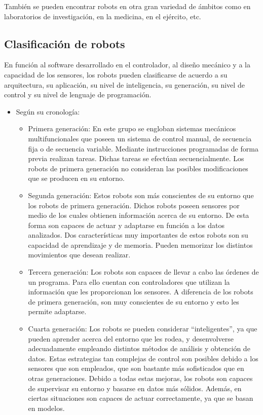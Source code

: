 También se pueden encontrar robots en otra gran variedad de ámbitos como en laboratorios de investigación, en la medicina, en el ejército, etc. 

\subsection{Clasificación de robots} 
En función al software desarrollado en el controlador, al diseño mecánico y a la capacidad de los sensores, los robots pueden clasificarse de acuerdo a su arquitectura, su aplicación, su nivel de inteligencia, su generación, su nivel de control y su nivel de lenguaje de programación.

\begin{itemize}
    \item Según su cronología:
    \begin{itemize}
         \item Primera generación: En este grupo se engloban sistemas mecánicos multifuncionales que poseen un sistema de control manual, de secuencia fija o de secuencia variable. Mediante instrucciones programadas de forma previa realizan tareas. Dichas tareas se efectúan secuencialmente. Los robots de primera generación no consideran las posibles modificaciones que se producen en su entorno. 
         \item Segunda generación: Estos robots son más conscientes de su entorno que los robots de primera generación. Dichos robots poseen sensores por medio de los cuales obtienen información acerca de su entorno. De esta forma son capaces de actuar y adaptarse en función a los datos analizados. Dos características muy importantes de estos robots son su capacidad de aprendizaje y de memoria. Pueden memorizar los distintos movimientos que desean realizar.
         \item Tercera generación: Los robots son capaces de llevar a cabo las órdenes de un programa. Para ello cuentan con controladores que utilizan la información que les proporcionan los sensores. A diferencia de los robots de primera generación, son muy conscientes de su entorno y esto les permite adaptarse.
         \item Cuarta generación: Los robots se pueden considerar “inteligentes”, ya que pueden aprender acerca del entorno que les rodea, y desenvolverse adecuadamente empleando distintos métodos de análisis y obtención de datos. Estas estrategias tan complejas de control son posibles debido a los sensores que son empleados, que son bastante más sofisticados que en otras generaciones. Debido a todas estas mejoras, los robots son capaces de supervisar su entorno y basarse en datos más sólidos. Además, en ciertas situaciones son capaces de actuar correctamente, ya que se basan en modelos.

\end{itemize}
\end{itemize}
